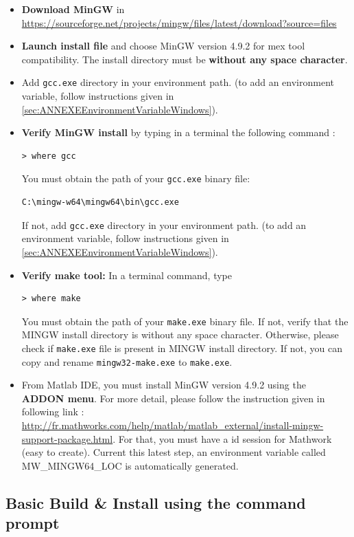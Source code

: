 \begin{itemize}
\item \textbf{Download MinGW} in \url{https://sourceforge.net/projects/mingw/files/latest/download?source=files}
\item \textbf{Launch install file} and choose MinGW version 4.9.2 for mex tool compatibility. The install directory must be \textbf{without any space character}.  
\item Add \texttt{gcc.exe} directory in your environment path. 
(to add an environment variable, follow instructions given in \ref{sec:ANNEXEEnvironmentVariableWindows}). 
\item \textbf{Verify MinGW install} by typing in a terminal the following command : 
\begin{lstlisting}
> where gcc
\end{lstlisting}
You must obtain the path of your \texttt{gcc.exe} binary file: 
\begin{lstlisting}[backgroundcolor=\color{white}]
C:\mingw-w64\mingw64\bin\gcc.exe
\end{lstlisting}
If not, add \texttt{gcc.exe} directory in your environment path. 
(to add an environment variable, follow instructions given in \ref{sec:ANNEXEEnvironmentVariableWindows}). 

\item \textbf{Verify make tool:} In a terminal command, type
\begin{lstlisting}
> where make
\end{lstlisting}
You must obtain the path of your \texttt{make.exe} binary file. 
If not, verify that the MINGW install directory is without any space character. Otherwise, please check if \texttt{make.exe} file is present in MINGW install directory. If not, you can copy and rename \texttt{mingw32-make.exe} to \texttt{make.exe}.

\item From Matlab IDE, you must install MinGW version 4.9.2 using the \textbf{ADDON menu}. For more detail, please follow the instruction given in following link :  
\url{http://fr.mathworks.com/help/matlab/matlab_external/install-mingw-support-package.html}. For that, you must have a id session for Mathwork (easy to create). Current this latest step, an environment variable called MW\_MINGW64\_LOC is automatically generated. 
\end{itemize}


\subsection{Basic Build \& Install using the command prompt}
\label{sec:WinMinGWBasicInstall}

